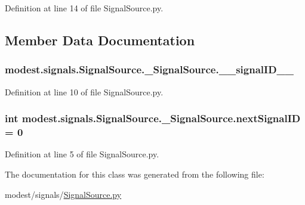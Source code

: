 Definition at line 14 of file Signal\+Source.\+py.



\subsection{Member Data Documentation}
\subsubsection[{\texorpdfstring{\+\_\+\+\_\+signal\+I\+D\+\_\+\+\_\+}{__signalID__}}]{\setlength{\rightskip}{0pt plus 5cm}modest.\+signals.\+Signal\+Source.\+\_\+\+Signal\+Source.\+\_\+\+\_\+signal\+I\+D\+\_\+\+\_\+\hspace{0.3cm}{\ttfamily [private]}}\hypertarget{classmodest_1_1signals_1_1SignalSource_1_1__SignalSource_a7506c0b19a9c3c2774627ebd65a89234}{}\label{classmodest_1_1signals_1_1SignalSource_1_1__SignalSource_a7506c0b19a9c3c2774627ebd65a89234}


Definition at line 10 of file Signal\+Source.\+py.

\subsubsection[{\texorpdfstring{next\+Signal\+ID}{nextSignalID}}]{\setlength{\rightskip}{0pt plus 5cm}int modest.\+signals.\+Signal\+Source.\+\_\+\+Signal\+Source.\+next\+Signal\+ID = 0\hspace{0.3cm}{\ttfamily [static]}}\hypertarget{classmodest_1_1signals_1_1SignalSource_1_1__SignalSource_abc8a46ab446416e7b72d27846c93f210}{}\label{classmodest_1_1signals_1_1SignalSource_1_1__SignalSource_abc8a46ab446416e7b72d27846c93f210}


Definition at line 5 of file Signal\+Source.\+py.



The documentation for this class was generated from the following file\+:\begin{DoxyCompactItemize}
\item 
modest/signals/\hyperlink{SignalSource_8py}{Signal\+Source.\+py}\end{DoxyCompactItemize}
